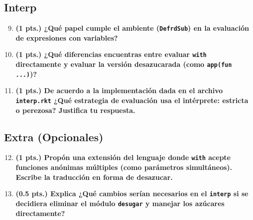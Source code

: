 \documentclass[12pt,letterpaper]{article}
\begin{document}
\subsection{Interp}

\begin{enumerate}
\setcounter{enumi}{8}

\item \textbf{(1 pts.) ¿Qué papel cumple el ambiente (\texttt{DefrdSub}) en la evaluación de expresiones con variables?}

\item \textbf{(1 pts.) ¿Qué diferencias encuentras entre evaluar \texttt{with} directamente y evaluar la versión desazucarada (como \texttt{app(fun ...)})?}

\item \textbf{(1 pts.) De acuerdo a la implementación dada en el archivo \texttt{interp.rkt} ¿Qué estrategia de evaluación usa el intérprete: estricta o perezosa? Justifica tu respuesta.}

\end{enumerate}

\subsection{Extra (Opcionales)}

\begin{enumerate}
\setcounter{enumi}{11}

\item \textbf{(1 pts.) Propón una extensión del lenguaje donde \texttt{with} acepte funciones anónimas múltiples (como parámetros simultáneos). Escribe la traducción en forma de desazucar.}

\item \textbf{(0.5 pts.) Explica ¿Qué cambios serían necesarios en el \texttt{interp} si se decidiera eliminar el módulo \texttt{desugar} y manejar los azúcares directamente?}

\end{enumerate}


\newpage
\printbibliography
\end{document}
